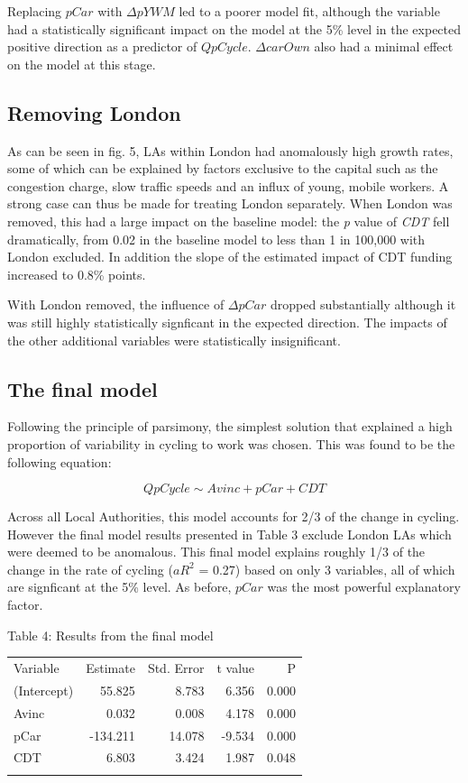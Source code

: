 Replacing $pCar$ with $\Delta pYWM$ led to a poorer model fit, although
the variable had a statistically significant impact on the model at the
5\% level in the expected positive direction as a predictor of
$Q pCycle$. $\Delta carOwn$ also had a minimal effect on the model at
this stage.

\subsection{Removing London}\label{removing-london}

As can be seen in fig. 5, LAs within London had anomalously high growth
rates, some of which can be explained by factors exclusive to the
capital such as the congestion charge, slow traffic speeds and an influx
of young, mobile workers. A strong case can thus be made for treating
London separately. When London was removed, this had a large impact on
the baseline model: the \emph{p} value of \emph{CDT} fell dramatically,
from 0.02 in the baseline model to less than 1 in 100,000 with London
excluded. In addition the slope of the estimated impact of CDT funding
increased to 0.8\% points.

With London removed, the influence of $\Delta pCar$ dropped
substantially although it was still highly statistically signficant in
the expected direction. The impacts of the other additional variables
were statistically insignificant.

\subsection{The final model}\label{the-final-model}

Following the principle of parsimony, the simplest solution that
explained a high proportion of variability in cycling to work was
chosen. This was found to be the following equation:

\[Q pCycle \sim Avinc + pCar +  CDT \]

Across all Local Authorities, this model accounts for 2/3 of the change
in cycling. However the final model results presented in Table 3 exclude
London LAs which were deemed to be anomalous. This final model explains
roughly 1/3 of the change in the rate of cycling ($aR^2$ = 0.27) based
on only 3 variables, all of which are signficant at the 5\% level. As
before, $pCar$ was the most powerful explanatory factor.

Table 4: Results from the final model

\begin{longtable}[c]{@{}lrrrr@{}}
\toprule\addlinespace
Variable & Estimate & Std. Error & t value & P
\\\addlinespace
\midrule\endhead
(Intercept) & 55.825 & 8.783 & 6.356 & 0.000
\\\addlinespace
Avinc & 0.032 & 0.008 & 4.178 & 0.000
\\\addlinespace
pCar & -134.211 & 14.078 & -9.534 & 0.000
\\\addlinespace
CDT & 6.803 & 3.424 & 1.987 & 0.048
\\\addlinespace
\bottomrule
\end{longtable}

